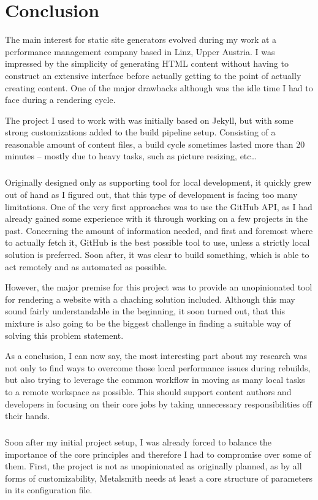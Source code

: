 \chapter{Conclusion}
\label{cha:conclusion}

The main interest for static site generators evolved during my work at a performance management company based in Linz, Upper Austria. I was impressed by the simplicity of generating HTML content without having to construct an extensive interface before actually getting to the point of actually creating content. One of the major drawbacks although was the idle time I had to face during a rendering cycle.

The project I used to work with was initially based on Jekyll, but with some strong customizations added to the build pipeline setup. Consisting of a reasonable amount of content files, a build cycle sometimes lasted more than 20 minutes -- mostly due to heavy tasks, such as picture resizing, etc\ldots

\paragraph{}
Originally designed only as supporting tool for local development, it quickly grew out of hand as I figured out, that this type of development is facing too many limitations. One of the very first approaches was to use the GitHub API, as I had already gained some experience with it through working on a few projects in the past. Concerning the amount of information needed, and first and foremost where to actually fetch it, GitHub is the best possible tool to use, unless a strictly local solution is preferred. Soon after, it was clear to build something, which is able to act remotely and as automated as possible.

However, the major premise for this project was to provide an unopinionated tool for rendering a website with a chaching solution included. Although this may sound fairly understandable in the beginning, it soon turned out, that this mixture is also going to be the biggest challenge in finding a suitable way of solving this problem statement.

As a conclusion, I can now say, the most interesting part about my research was not only to find ways to overcome those local performance issues during rebuilds, but also trying to leverage the common workflow in moving as many local tasks to a remote workspace as possible. This should support content authors and developers in focusing on their core jobs by taking unnecessary responsibilities off their hands.

\paragraph{}
Soon after my initial project setup, I was already forced to balance the importance of the core principles and therefore I had to compromise over some of them. First, the project is not as unopinionated as originally planned, as by all forms of customizability, Metalsmith needs at least a core structure of parameters in its configuration file.
